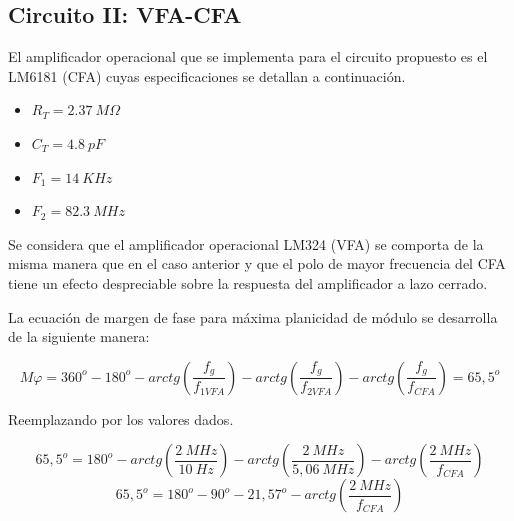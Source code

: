 \subsection{Circuito II: VFA-CFA}
\hspace{1mm} El amplificador operacional que se implementa para el circuito propuesto es el LM6181 (CFA) cuyas especificaciones se detallan a continuación.

\begin{itemize}[itemsep=1pt]
    \item \(R_T=2.37~M\Omega\)
    \item \(C_T=4.8~pF\)
    \item \(F_1=14~KHz\)
    \item \(F_2=82.3~MHz\)
\end{itemize}

\bigskip
\hspace{1mm} Se considera que el amplificador operacional LM324 (VFA) se comporta de la misma manera que en el caso anterior  y que el polo de mayor frecuencia del CFA tiene un efecto despreciable sobre la respuesta del amplificador a lazo cerrado.

\bigskip
\hspace{1mm} La ecuación de margen de fase para máxima planicidad de módulo se desarrolla de la siguiente manera:

\begin{equation}
    M \varphi = 360^o - 180^o - arctg \left(\frac{f_g}{f_{1VFA}}\right) - arctg \left(\frac{f_g}{f_{2VFA}}\right) - arctg \left(\frac{f_g}{f_{CFA}}\right) = 65,5^o
\end{equation}

\bigskip
\hspace{1mm} Reemplazando por los valores dados.

\begin{equation}
    65,5^o = 180^o - arctg \left(\frac{2~MHz}{10~Hz}\right) - arctg \left(\frac{2~MHz}{5,06~MHz}\right) - arctg \left(\frac{2~MHz}{f_{CFA}}\right)
\end{equation}
\begin{equation}
    65,5^o = 180^o - 90^o - 21,57^o - arctg \left(\frac{2~MHz}{f_{CFA}}\right)
\end{equation}


